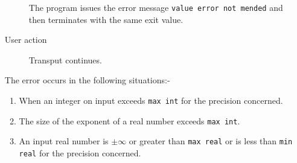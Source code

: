 \begin{enumerate}
\begin{description}
The program issues the error message \verb|value error not mended| and
then terminates with the same exit value.
\item[User action]
Transput continues.
\end{description}
The error occurs in the following situations:-
\begin{enumerate}
\item When an integer on input exceeds \verb|max int| for the precision
concerned.
\item The size of the exponent of a real number exceeds \texttt{max
int}.
\item An input real number is $\pm\infty$ or greater than \texttt{max
real} or is less than \verb|min real| for the precision concerned.
\end{enumerate}
\end{enumerate}

